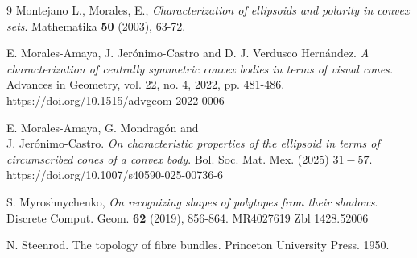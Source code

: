 \documentclass[12pt]{amsart}
\begin{document}
\begin{thebibliography}{9}
 Montejano L., Morales, E., \emph{Characterization of ellipsoids and polarity in convex sets}. Mathematika {\bf 50} (2003), 63-72.

 
 E. Morales-Amaya, J. Jer\'onimo-Castro and D. J. Verdusco Hern\'andez. \emph{A characterization of centrally symmetric convex bodies in terms of visual cones.} Advances in Geometry, vol. 22, no. 4, 2022, pp. 481-486. https://doi.org/10.1515/advgeom-2022-0006

 E. Morales-Amaya, G. Mondrag\'on and \\J. Jer\'onimo-Castro. 
\emph{On characteristic properties of the ellipsoid in terms of circumscribed cones of a convex body}.  Bol. Soc. Mat. Mex. (2025) $31-57$. https://doi.org/10.1007/s40590-025-00736-6

 S. Myroshnychenko, \emph{On recognizing shapes of polytopes from their shadows}. Discrete Comput. Geom. {\bf 62} (2019), 856-864. MR4027619 Zbl 1428.52006

  
 N. Steenrod. The topology of fibre bundles. Princeton University Press. 1950.
 
\end{thebibliography}
\end{document}
